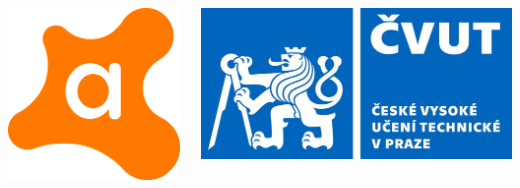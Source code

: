 \documentclass[25pt]{tikzposter}
\begin{document}
\begin{columns}
{\begin{minipage}{.04\textwidth}
  \end{minipage}
  \hspace{.03\textwidth}
  \begin{minipage}{.05\textwidth}
    \includegraphics[height=\textwidth]{avast-logo.png}
  \end{minipage}
  \hspace{.01\textwidth}
  \begin{minipage}{.05\textwidth}
    \includegraphics[height=\textwidth]{cvut-logo.jpeg}
  \end{minipage}
  \hspace{.04\textwidth}
}


\end{columns}
\end{document}
